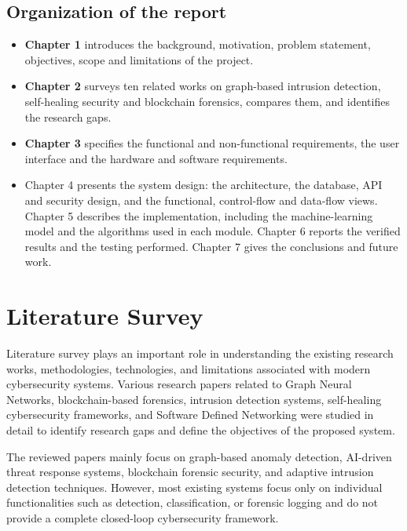\documentclass[12pt,a4paper]{report}
\begin{document}
\section{Organization of the report}
\begin{itemize}
    \item \textbf{Chapter 1} introduces the background, motivation, problem statement, objectives, scope and limitations of the project.

    \item \textbf{Chapter 2} surveys ten related works on graph-based intrusion detection, self-healing security and blockchain forensics, compares them, and identifies the research gaps.

    \item \textbf{Chapter 3} specifies the functional and non-functional requirements, the user interface and the hardware and software requirements.

    \item {Chapter 4 presents the system design: the architecture, the database, API and security design, and the functional, control-flow and data-flow views. Chapter 5 describes the implementation, including the machine-learning model and the algorithms used in each module. Chapter 6 reports the verified results and the testing performed. Chapter 7 gives the conclusions and future work}.
\end{itemize}





\chapter{Literature Survey}
Literature survey plays an important role in understanding the existing research works, methodologies, technologies, and limitations associated with modern cybersecurity systems. Various research papers related to Graph Neural Networks, blockchain-based forensics, intrusion detection systems, self-healing cybersecurity frameworks, and Software Defined Networking were studied in detail to identify research gaps and define the objectives of the proposed system.

The reviewed papers mainly focus on graph-based anomaly detection, AI-driven threat response systems, blockchain forensic security, and adaptive intrusion detection techniques. However, most existing systems focus only on individual functionalities such as detection, classification, or forensic logging and do not provide a complete closed-loop cybersecurity framework.
\end{document}
